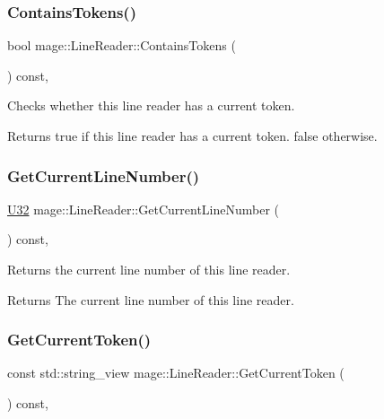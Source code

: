 \subsubsection{\texorpdfstring{Contains\+Tokens()}{ContainsTokens()}}
{\footnotesize\ttfamily bool mage\+::\+Line\+Reader\+::\+Contains\+Tokens (\begin{DoxyParamCaption}{ }\end{DoxyParamCaption}) const\hspace{0.3cm}{\ttfamily [protected]}, {\ttfamily [noexcept]}}

Checks whether this line reader has a current token.

\begin{DoxyReturn}{Returns}
{\ttfamily true} if this line reader has a current token. {\ttfamily false} otherwise. 
\end{DoxyReturn}
\mbox{\label{classmage_1_1_line_reader_aa0ed768e2799b74f2341c56fc6ac4969}} 
\subsubsection{\texorpdfstring{Get\+Current\+Line\+Number()}{GetCurrentLineNumber()}}
{\footnotesize\ttfamily \mbox{\hyperlink{namespacemage_a41c104c036fba3756a74e19f793eeaa1}{U32}} mage\+::\+Line\+Reader\+::\+Get\+Current\+Line\+Number (\begin{DoxyParamCaption}{ }\end{DoxyParamCaption}) const\hspace{0.3cm}{\ttfamily [protected]}, {\ttfamily [noexcept]}}

Returns the current line number of this line reader.

\begin{DoxyReturn}{Returns}
The current line number of this line reader. 
\end{DoxyReturn}
\mbox{\label{classmage_1_1_line_reader_a543a1b133b0067cbe69e81dbad5ea0e1}} 
\subsubsection{\texorpdfstring{Get\+Current\+Token()}{GetCurrentToken()}}
{\footnotesize\ttfamily const std\+::string\+\_\+view mage\+::\+Line\+Reader\+::\+Get\+Current\+Token (\begin{DoxyParamCaption}{ }\end{DoxyParamCaption}) const\hspace{0.3cm}{\ttfamily [private]}, {\ttfamily [noexcept]}}

